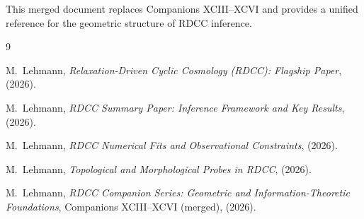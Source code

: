 \documentclass[11pt,a4paper]{article}
\begin{document}
This merged document replaces Companions XCIII--XCVI and provides a unified 
reference for the geometric structure of RDCC inference.

\begin{thebibliography}{9}

M.~Lehmann,
\textit{Relaxation-Driven Cyclic Cosmology (RDCC): Flagship Paper},
(2026).

M.~Lehmann,
\textit{RDCC Summary Paper: Inference Framework and Key Results},
(2026).

M.~Lehmann,
\textit{RDCC Numerical Fits and Observational Constraints},
(2026).

M.~Lehmann,
\textit{Topological and Morphological Probes in RDCC},
(2026).

M.~Lehmann,
\textit{RDCC Companion Series: Geometric and Information-Theoretic Foundations},
Companions XCIII–XCVI (merged), (2026).

\end{thebibliography}
\end{document}
